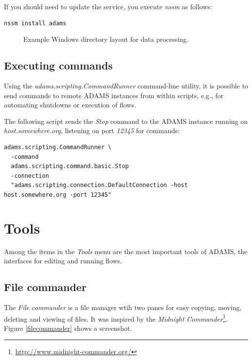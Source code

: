 \noindent If you should need to update the service, you execute \textit{nssm}
as follows:
\begin{verbatim}
nssm install adams
\end{verbatim}


\begin{figure}[htb]
  \caption{Example Windows directory layout for data processing.}
  \label{example_windows_dir_layout_data_processing}
\end{figure}


\section{Executing commands}
Using the \textit{adams.scripting.CommandRunner} command-line utility, it is
possible to send commands to remote ADAMS instances from within scripts, e.g.,
for automating shutdowns or execution of flows.

The following script sends the \textit{Stop} command to the ADAMS instance
running on \textit{host.somewhere.org}, listening on port \textit{12345} for
commands:
\begin{verbatim}
adams.scripting.CommandRunner \
  -command
  adams.scripting.command.basic.Stop
  -connection
  "adams.scripting.connection.DefaultConnection -host host.somewhere.org -port 12345"
\end{verbatim}



\chapter{Tools}
Among the items in the \textit{Tools} menu are the most important tools of
ADAMS, the interfaces for editing and running flows.

\section{File commander}
The \textit{File commander} is a file manager wtih two panes for easy copying,
moving, deleting and viewing of files. It was inspired by the
\textit{Midnight Commander}\footnote{\url{http://www.midnight-commander.org/}{}}.
Figure \ref{filecommander} shows a screenshot.

